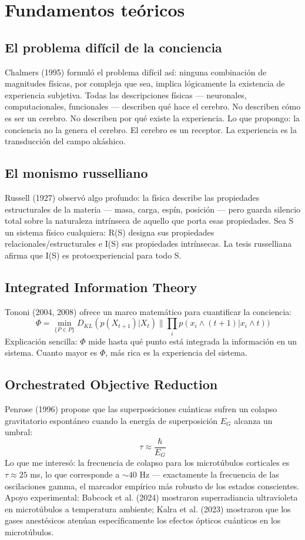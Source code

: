 \documentclass[11pt,a4paper]{article}
\begin{document}
\section{Fundamentos teóricos}
\subsection{El problema difícil de la conciencia}
Chalmers (1995) formuló el problema difícil así: ninguna combinación de magnitudes físicas, por compleja que sea, implica lógicamente la existencia de experiencia subjetiva. Todas las descripciones físicas --- neuronales, computacionales, funcionales --- describen qué hace el cerebro. No describen cómo es ser un cerebro. No describen por qué existe la experiencia. Lo que propongo: la conciencia no la genera el cerebro. El cerebro es un receptor. La experiencia es la transducción del campo akáshico.

\subsection{El monismo russelliano}
Russell (1927) observó algo profundo: la física describe las propiedades estructurales de la materia --- masa, carga, espín, posición --- pero guarda silencio total sobre la naturaleza intrínseca de aquello que porta esas propiedades. Sea S un sistema físico cualquiera: R(S) designa sus propiedades relacionales/estructurales e I(S) sus propiedades intrínsecas. La tesis russelliana afirma que I(S) es protoexperiencial para todo S.

\subsection{Integrated Information Theory}
Tononi (2004, 2008) ofrece un marco matemático para cuantificar la conciencia:
\begin{equation}
\Phi = \min_{\{P \in P\}} D_{KL}(p(X_{t+1})|X_{t}) \parallel \prod_{i} p(x_{i} \land (t+1)|x_{i} \land t))
\end{equation}
Explicación sencilla: $\Phi$ mide hasta qué punto está integrada la información en un sistema. Cuanto mayor es $\Phi$, más rica es la experiencia del sistema.

\subsection{Orchestrated Objective Reduction}
Penrose (1996) propone que las superposiciones cuánticas sufren un colapso gravitatorio espontáneo cuando la energía de superposición $E_G$ alcanza un umbral:
\begin{equation}
\tau \approx \frac{\hbar}{E_G}
\end{equation}
Lo que me interesó: la frecuencia de colapso para los microtúbulos corticales es $\tau \approx 25$ ms, lo que corresponde a $\sim 40$ Hz --- exactamente la frecuencia de las oscilaciones gamma, el marcador empírico más robusto de los estados conscientes. Apoyo experimental: Babcock et al. (2024) mostraron superradiancia ultravioleta en microtúbulos a temperatura ambiente; Kalra et al. (2023) mostraron que los gases anestésicos atenúan específicamente los efectos ópticos cuánticos en los microtúbulos.
\end{document}
